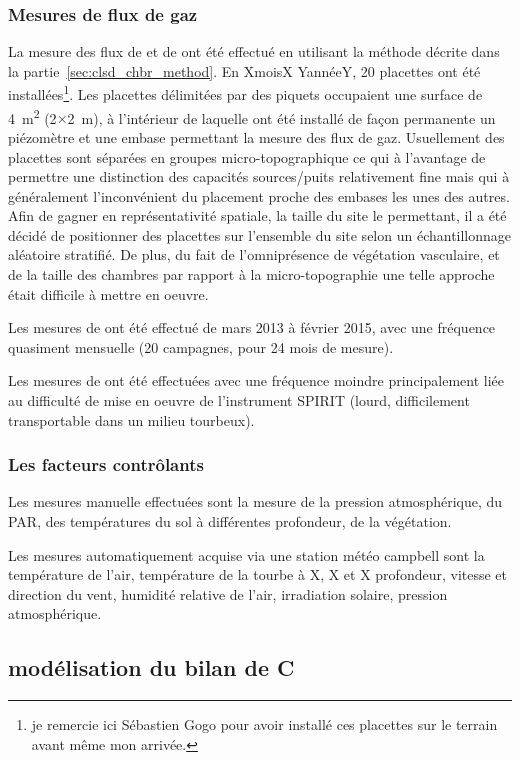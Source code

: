 \subsubsection{Mesures de flux de gaz}
La mesure des flux de \coo et de \chh ont été effectué en utilisant la méthode décrite dans la partie~\ref{sec:clsd_chbr_method}.
En XmoisX YannéeY, 20 placettes ont été installées\footnote{je remercie ici Sébastien Gogo pour avoir installé ces placettes sur le terrain avant même mon arrivée.}. 
Les placettes délimitées par des piquets occupaient une surface de \SI{4}{\square\metre} (2$\times$\SI{2}{\metre}), à l'intérieur de laquelle ont été installé de façon permanente un piézomètre et une embase permettant la mesure des flux de gaz.
Usuellement des placettes sont séparées en groupes micro-topographique ce qui à l'avantage de permettre une distinction des capacités sources/puits relativement fine mais qui à généralement l'inconvénient du placement proche des embases les unes des autres.
Afin de gagner en représentativité spatiale, la taille du site le permettant, il a été décidé de positionner des placettes sur l'ensemble du site selon un échantillonnage aléatoire stratifié.
De plus, du fait de l'omniprésence de végétation vasculaire, et de la taille des chambres par rapport à la micro-topographie une telle approche était difficile à mettre en oeuvre.

Les mesures de \coo ont été effectué de mars 2013 à février 2015, avec une fréquence quasiment mensuelle (20 campagnes, pour 24 mois de mesure).

Les mesures de \chh ont été effectuées avec une fréquence moindre principalement liée au difficulté de mise en oeuvre de l'instrument SPIRIT (lourd, difficilement transportable dans un milieu tourbeux).

\subsubsection{Les facteurs contrôlants}

Les mesures manuelle effectuées sont la mesure de la pression atmosphérique, du PAR, des températures du sol à différentes profondeur, de la végétation.

Les mesures automatiquement acquise via une station météo campbell sont la température de l'air, température de la tourbe à X, X et X profondeur, vitesse et direction du vent, humidité relative de l'air, irradiation solaire, pression atmosphérique.

\subsection{modélisation du bilan de C}

